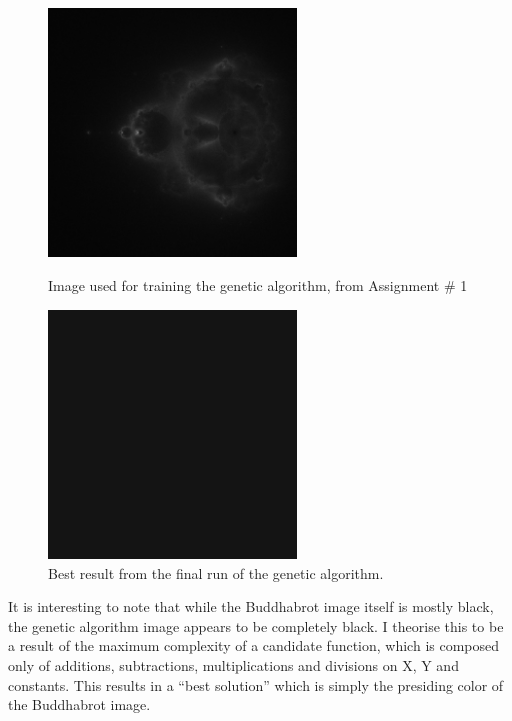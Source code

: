 \documentclass{article}
\begin{document}
\begin{figure}[htbp]
        \centering
        \begin{minipage}{.5\textwidth}
                \centering
                \includegraphics[width=6.6cm]{../master.jpeg}
                \caption{Image used for training the genetic algorithm, from Assignment \# 1}
                \label{fig:fig1}
        \end{minipage}%
        \begin{minipage}{.5\textwidth}
                \centering
                \includegraphics[width=6.6cm]{../new_result.jpeg}
                \caption{Best result from the final run of the genetic algorithm.}
                \label{fig:fig2}
        \end{minipage}
\end{figure}

It is interesting to note that while the Buddhabrot image itself is mostly black, the genetic algorithm image appears to be completely black. I theorise this to be a result of the maximum complexity of a candidate function, which is composed only of additions, subtractions, multiplications and divisions on X, Y and constants. This results in a ``best solution'' which is simply the presiding color of the Buddhabrot image.
\end{document}
